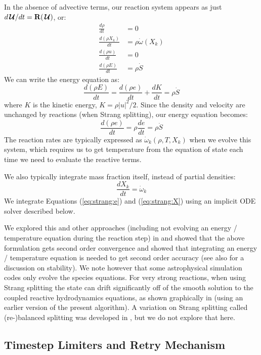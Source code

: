 \documentclass{aastex63}
\newcommand{\omegadot}{\dot{\omega}}
\newcommand{\Sdot}{\dot{S}}
\newcommand{\odt}[1]{{\frac{{d#1}}{dt}}}
\newcommand{\Uc}{{\,\bm{\mathcal{U}}}}
\newcommand{\Rb}{{\bf R}}
\newcommand{\MarginPar}[1]{\marginpar{\vskip-\baselineskip\raggedright\tiny\sffamily\hrule\smallskip{\color{red}#1}\par\smallskip\hrule}}
\begin{document}
In the absence of advective terms, our reaction system appears as just
$d\Uc/dt = \Rb(\Uc)$, or:
\begin{align}
\odt{\rho} & = 0 \\
\odt{(\rho X_k)} &= \rho \omegadot(X_k) \\
\odt{(\rho u)} &= 0 \\
\odt{(\rho E)} &= \rho \Sdot
\end{align}
We can write the energy equation as:
\begin{equation}
\odt{(\rho E)} = \odt{(\rho e)} + \odt{K} = \rho \Sdot
\end{equation}
where $K$ is the kinetic energy, $K = \rho |u|^2/2$.  Since the density and velocity
are unchanged by reactions (when Strang splitting), our energy equation becomes:
\begin{equation}
\label{eq:strang:e}
\odt{(\rho e)} = \rho \odt{e} = \rho \Sdot
\end{equation}
The reaction rates are typically expressed as $\omegadot_k(\rho, T, X_k)$
when we evolve this system, which requires us to get temperature from
the equation of state each
time we need to evaluate the reactive terms.  

We also typically integrate mass fraction itself, instead of partial
densities:
\begin{equation}
\label{eq:strang:X}
\odt{X_k} = \omegadot_k
\end{equation}
We integrate Equations (\ref{eq:strang:e}) and (\ref{eq:strang:X})
using an implicit ODE solver described below.

We explored this and other approaches (including not evolving an
energy / temperature equation during the reaction step) in
\citet{strang_rnaas} and showed that the above formulation gets second
order convergence and showed that integrating an energy / temperature
equation is needed to get second order accuracy (see also
\citealt{muller:1986} for a discussion on stability).  We note however
that some astrophysical simulation codes only evolve the species
equations.  For very strong reactions, when using Strang splitting the
state can drift significantly off of the smooth solution to the
coupled reactive hydrodynamics equations, as shown graphically in
\citet{astronum:2018} (using an earlier version of the present
algorithm).  A variation on Strang splitting called (re-)balanced
splitting was developed in \citet{speth:2013}, but we do not explore
that here. \MarginPar{keep this sentence?}


\subsection{Timestep Limiters and Retry Mechanism}
\end{document}

